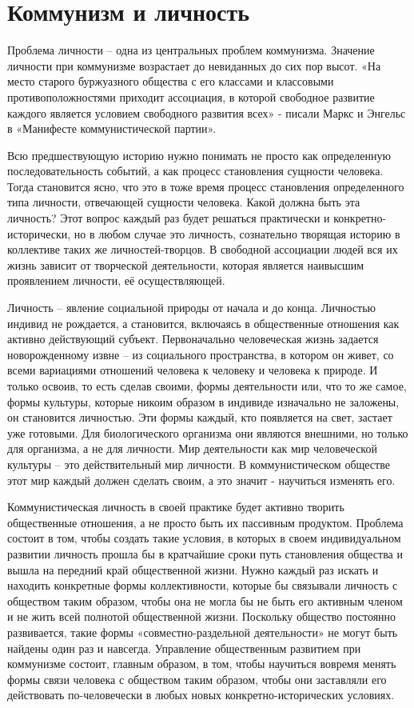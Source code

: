 \documentclass[../main]{subfiles}
\begin{document}
\ifSubfilesClassLoaded{\setcounter{page}{47}}{}
\section{Коммунизм и личность}
\label{sec:08_kommunizm_lichnost}

Проблема личности – одна из центральных проблем коммунизма. Значение личности при коммунизме возрастает до невиданных до сих пор высот. «На место старого буржуазного общества с его классами и классовыми противоположностями приходит ассоциация, в которой свободное развитие каждого является условием свободного развития всех» - писали Маркс и Энгельс в «Манифесте коммунистической партии».

Всю предшествующую историю нужно понимать не просто как определенную последовательность событий, а как процесс становления сущности человека. Тогда становится ясно, что это в тоже время процесс становления определенного типа личности, отвечающей сущности человека. Какой должна быть эта личность? Этот вопрос каждый раз будет решаться практически и конкретно-исторически, но в любом случае это личность, сознательно творящая историю в коллективе таких же личностей-творцов. В свободной ассоциации людей вся их жизнь зависит от творческой деятельности, которая является наивысшим проявлением личности, её осуществляющей.

Личность – явление социальной природы от начала и до конца. Личностью индивид не рождается, а становится, включаясь в общественные отношения как активно действующий субъект. Первоначально человеческая жизнь задается новорожденному извне – из социального пространства, в котором он живет, со всеми вариациями отношений человека к человеку и человека к природе. И только освоив, то есть сделав своими, формы деятельности или, что то же самое, формы культуры, которые никоим образом в индивиде изначально не заложены, он становится личностью. Эти формы каждый, кто появляется на свет, застает уже готовыми. Для биологического организма они являются внешними, но только для организма, а не для личности. Мир деятельности как мир человеческой культуры – это действительный мир личности. В коммунистическом обществе этот мир каждый должен сделать своим, а это значит - научиться изменять его.

Коммунистическая личность в своей практике будет активно творить общественные отношения, а не просто быть их пассивным продуктом. Проблема состоит в том, чтобы создать такие условия, в которых в своем индивидуальном развитии личность прошла бы в кратчайшие сроки путь становления общества и вышла на передний край общественной жизни. Нужно каждый раз искать и находить конкретные формы коллективности, которые бы связывали личность с обществом таким образом, чтобы она не могла бы не быть его активным членом и не жить всей полнотой общественной жизни. Поскольку общество постоянно развивается, такие формы «совместно-раздельной деятельности» не могут быть найдены один раз и навсегда. Управление общественным развитием при коммунизме состоит, главным образом, в том, чтобы научиться вовремя менять формы связи человека с обществом таким образом, чтобы они заставляли его действовать по-человечески в любых новых конкретно-исторических условиях.
\end{document}
